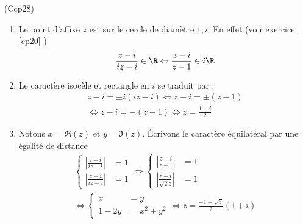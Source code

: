 \begin{tiny}(Ccp28)\end{tiny} 
\begin{enumerate}
  \item Le point d'affixe $z$ est sur le cercle de diamètre $1, i$. En effet (voir exercice \ref{cp20} )
\begin{displaymath}
  \frac{z-i}{iz-i}\in \R \Leftrightarrow \frac{z-i}{z-1}\in i\R 
\end{displaymath}

  \item Le caractère isocèle et rectangle en $i$ se traduit par :
  \begin{multline*}
    z-i = \pm i (iz-i)
    \Leftrightarrow z -i = \pm(z-1)\\
    \Leftrightarrow z-i = -(z - 1)
    \Leftrightarrow z = \frac{1+i}{2}
  \end{multline*}

  \item Notons $x=\Re(z)$ et $y=\Im(z)$. \'Ecrivons le caractère équilatéral par une égalité de distance
\begin{multline*}
\left\lbrace 
\begin{aligned}
 \left|\frac{z-i}{iz-i}\right| &= 1 \\ \left|\frac{z-i}{iz-z}\right| &= 1 
\end{aligned}
\right. 
\Leftrightarrow
\left\lbrace 
\begin{aligned}
 \left|\frac{z-i}{z-1}\right| &= 1  
 \\ \left|\frac{z-i}{\sqrt{2}z}\right| &= 1 
\end{aligned}
\right. \\
\Leftrightarrow
\left\lbrace 
\begin{aligned}
 x &= y \\ 1-2y &= x^2 + y^2 
\end{aligned}
\right. \Leftrightarrow z = \frac{-1\pm \sqrt{3}}{2}(1+i)
\end{multline*}

\end{enumerate}
